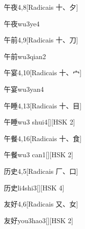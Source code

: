 \begin{entry}{午夜}{4,8}[Radicais ⼗、⼣]
  \begin{phonetics}{午夜}{wu3ye4}
  \end{phonetics}
\end{entry}

\begin{entry}{午前}{4,9}[Radicais ⼗、⼑]
  \begin{phonetics}{午前}{wu3qian2}
  \end{phonetics}
\end{entry}

\begin{entry}{午宴}{4,10}[Radicais ⼗、⼧]
  \begin{phonetics}{午宴}{wu3yan4}
  \end{phonetics}
\end{entry}

\begin{entry}{午睡}{4,13}[Radicais ⼗、⽬]
  \begin{phonetics}{午睡}{wu3 shui4}[][HSK 2]
  \end{phonetics}
\end{entry}

\begin{entry}{午餐}{4,16}[Radicais ⼗、⾷]
  \begin{phonetics}{午餐}{wu3 can1}[][HSK 2]
  \end{phonetics}
\end{entry}

\begin{entry}{历史}{4,5}[Radicais ⼚、⼝]
  \begin{phonetics}{历史}{li4shi3}[][HSK 4]
  \end{phonetics}
\end{entry}

\begin{entry}{友好}{4,6}[Radicais ⼜、⼥]
  \begin{phonetics}{友好}{you3hao3}[][HSK 2]
  \end{phonetics}
\end{entry}

